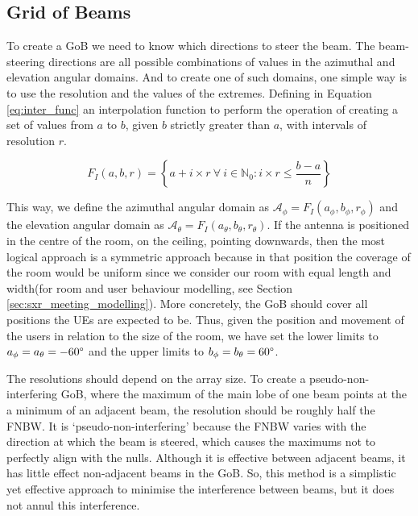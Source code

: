 \subsection{Grid of Beams}
\label{sec:GoB}

To create a GoB we need to know which directions to steer the beam. The beam-steering directions are all possible combinations of values in the azimuthal and elevation angular domains. And to create one of such domains, one simple way is to use the resolution and the values of the extremes. Defining in Equation \eqref{eq:inter_func} an interpolation function to perform the operation of creating a set of values from $a$ to $b$, given $b$ strictly greater than $a$, with intervals of resolution $r$.

\begin{equation} \label{eq:inter_func}
    F_I(a, b, r) = \left\{a + i \times r \  \forall \ i \in \mathbb{N}_0: i \times r \leq \frac{b-a}{n} \right\}
\end{equation}

This way, we define the azimuthal angular domain as $\mathcal{A}_\phi = F_I(a_\phi, b_\phi, r_\phi)$ and the elevation angular domain as $\mathcal{A}_\theta = F_I(a_\theta, b_\theta, r_\theta)$. If the antenna is positioned in the centre of the room, on the ceiling, pointing downwards, then the most logical approach is a symmetric approach because in that position the coverage of the room would be uniform since we consider our room with equal length and width(for room and user behaviour modelling, see Section \ref{sec:sxr_meeting_modelling}). More concretely, the GoB should cover all positions the UEs are expected to be. Thus, given the position and movement of the users in relation to the size of the room, we have set the lower limits to $a_\phi = a_\theta = -60\text{\textdegree}$ and the upper limits to $b_\phi = b_\theta = 60\text{\textdegree}$. 

The resolutions should depend on the array size. To create a pseudo-non-interfering GoB, where the maximum of the main lobe of one beam points at the a minimum of an adjacent beam, the resolution should be roughly half the \ac{FNBW}. It is `pseudo-non-interfering' because the \ac{FNBW} varies with the direction at which the beam is steered, which causes the maximums not to perfectly align with the nulls. Although it is effective between adjacent beams, it has little effect non-adjacent beams in the GoB. So, this method is a simplistic yet effective approach to minimise the interference between beams, but it does not annul this interference. 

